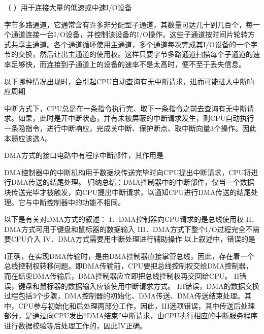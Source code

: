 \question （ ）用于连接大量的低速或中速I/O设备
\par{}
\begin{solution}字节多路通道，它通常含有许多非分配型子通道，其数量可达几十到几百个，每一个通道连接一台I/O设备，并控制该设备的I/O操作。这些子通道按时间片轮转方式共享主通道。各个通道循环使用主通道，多个通道每次完成其I/O设备的一个字节的交换，然后让出主通道的使用权。这样只要字节多路通道扫描每个子通道的速率足够快，而连接到子通道上的设备的速率不是太高时，便不至于丢失信息。
\end{solution}
\question 以下哪种情况出现时，会引起CPU自动查询有无中断请求，进而可能进入中断响应周期
\par{}
\begin{solution}中断方式下，CPU总是在一条指令执行完、取下一条指令之前去查询有无中断请求。如果，此时是开中断状态，并有未被屏蔽的中断请求发生，则CPU自动执行一条隐指令，进行中断响应，完成关中断、保护断点、取中断向量3个操作。因此本题应该选A。
\end{solution}
\question DMA方式的接口电路中有程序中断部件，其作用是
\par{}
\begin{solution}DMA控制器中的中断机构用于数据块传送完毕时向CPU提出中断请求，CPU将进行DMA传送的结尾处理。
归纳总结：DMA控制器中的中断部件，仅当一个数据块传送完毕才被触发，向CPU提出中断请求，以通知CPU进行DMA传送的结尾处理。它与中断控制器中的功能不相同。
\end{solution}
\question 以下是有关对DMA方式的叙述： I．DMA控制器向CPU请求的是总线使用权
II．DMA方式可用于键盘和鼠标器的数据输入
III．DMA方式下整个I/O过程完全不需要CPU介入
IV．DMA方式需要用中断处理进行辅助操作 以上叙述中，错误的是
\par{}
\begin{solution}I正确，在实现DMA传输时，是由DMA控制器直接掌管总线，因此，存在着一个总线控制权转移问题。即DMA传输前，CPU要把总线控制权交给DMA控制器，而在结束DMA传输后，DMA控制器应立即把总线控制权再交回给CPU。
II错误，键盘和鼠标器的数据输入应该使用中断请求方式。
III错误，DMA的数据交换过程包括3个步骤，DMA控制器的初始化、DMA传送、DMA传送结束处理。其中，CPU参与初始化和后处理两部分工作，因此，III选项错误，其中传送后处理部分，是通过向CPU发出``DMA结束''中断请求，由CPU执行相应的中断服务程序进行数据校验等后处理工作的，因此IV正确。
\end{solution}
